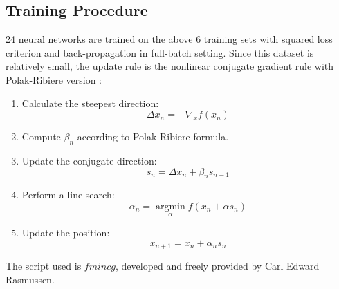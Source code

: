 \documentclass[conference]{IEEEtran}
\begin{document}
\subsection{Training Procedure}
24 neural networks are trained on the above 6 training sets with squared loss criterion and back-propagation in full-batch setting. Since this dataset is relatively small, the update rule is the nonlinear conjugate gradient rule with Polak-Ribiere version \cite{grippo1997globally}:
\begin{enumerate}
\item Calculate the steepest direction: \[\Delta {x_n} =  - {\nabla _x}f({x_n})\] 
\item Compute \({\beta _n}\) according to Polak-Ribiere formula\cite{Polak1969}. 
\item Update the conjugate direction: \[{s_n} = \Delta {x_n} + {\beta _n}{s_{n - 1}}\]
\item Perform a line search: \[{\alpha _n} = \mathop {\arg \min }\limits_\alpha  f({x_n} + \alpha {s_n})\]
\item Update the position: \[{x_{n + 1}} = {x_n} + {\alpha _n}{s_n}\]
\end{enumerate}
The script used is $fmincg$, developed and freely provided by Carl Edward Rasmussen. 
\end{document}
